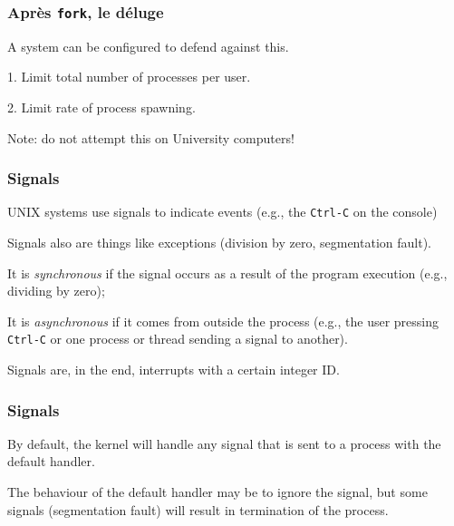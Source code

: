\begin{frame}
\frametitle{Apr\`{e}s \texttt{fork}, le d\'{e}luge}
A system can be configured to defend against this.

1. Limit total number of processes per user.

2. Limit rate of process spawning.

Note: do not attempt this on University computers!

\end{frame}


\begin{frame}
\frametitle{Signals}

UNIX systems use signals to indicate events (e.g., the \texttt{Ctrl-C} on the console)

Signals also are things like exceptions (division by zero, segmentation fault).

It is \textit{synchronous} if the signal occurs as a result of the program execution (e.g., dividing by zero); 

It is \textit{asynchronous} if it comes from outside the process (e.g., the user pressing \texttt{Ctrl-C} or one process or thread sending a signal to another). 

Signals are, in the end, interrupts with a certain integer ID.


\end{frame}


\begin{frame}
\frametitle{Signals}

By default, the kernel will handle any signal that is sent to a process with the default handler. 

The behaviour of the default handler may be to ignore the signal, but some signals (segmentation fault) will result in termination of the process. 


\end{frame}


